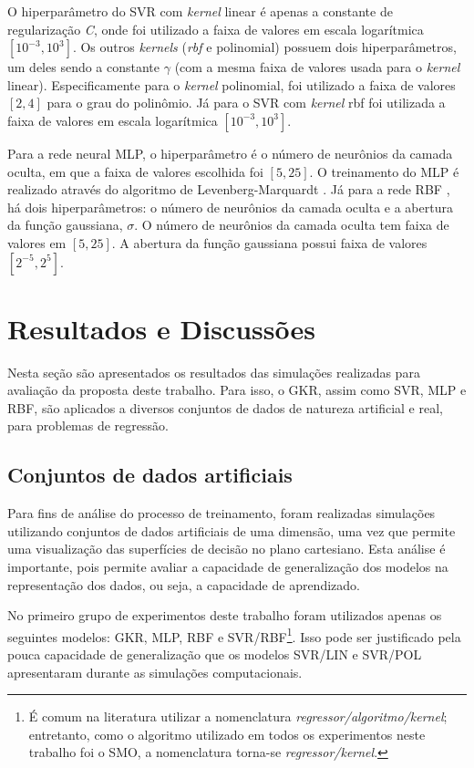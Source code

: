 O hiperparâmetro do SVR com \textit{kernel} linear é apenas a constante de regularização \textit{C}, onde foi utilizado a faixa de valores em escala logarítmica $[10^{-3}, 10^3]$. Os outros \textit{kernels} (\textit{rbf} e polinomial) possuem dois hiperparâmetros, um deles sendo a constante $\gamma$ (com a mesma faixa de valores usada para o \textit{kernel} linear). Especificamente para o \textit{kernel} polinomial, foi utilizado a faixa de valores $[2, 4]$ para o grau do polinômio. Já para o SVR com \textit{kernel} rbf foi utilizada a faixa de valores em escala logarítmica $[10^{-3}, 10^3]$.

Para a rede neural MLP, o hiperparâmetro é o número de neurônios da camada oculta, em que a faixa de valores escolhida foi $[5, 25]$. O treinamento do MLP é realizado através do algoritmo de Levenberg-Marquardt \cite{hagan1994}. Já para a rede RBF \cite{powell1987}, há dois hiperparâmetros: o número de neurônios da camada oculta e a abertura da função gaussiana, $\sigma$. O número de neurônios da camada oculta tem faixa de valores em $[5, 25]$. A abertura da função gaussiana possui faixa de valores $[2^{-5}, 2^5]$.

\section{Resultados e Discussões} \label{sec:results}
Nesta seção são apresentados os resultados das simulações realizadas para avaliação da proposta deste trabalho. Para isso, o GKR, assim como SVR, MLP e RBF, são aplicados a diversos conjuntos de dados de natureza artificial e real, para problemas de regressão.

\subsection{Conjuntos de dados artificiais}
Para fins de análise do processo de treinamento, foram realizadas simulações utilizando conjuntos de dados artificiais de uma dimensão, uma vez que permite uma visualização das superfícies de decisão no plano cartesiano. Esta análise é importante, pois permite avaliar a capacidade de generalização dos modelos na representação dos dados, ou seja, a capacidade de aprendizado.

No primeiro grupo de experimentos deste trabalho foram utilizados apenas os seguintes modelos: GKR, MLP, RBF e SVR/RBF\footnote{É comum na literatura utilizar a nomenclatura \textit{regressor/algoritmo/kernel}; entretanto, como o algoritmo utilizado em todos os experimentos neste trabalho foi o SMO, a nomenclatura torna-se \textit{regressor/kernel}.}. Isso pode ser justificado pela pouca capacidade de generalização que os modelos SVR/LIN e SVR/POL apresentaram durante as simulações computacionais.

